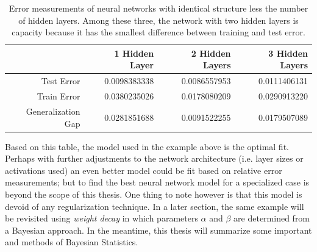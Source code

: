 \begin{table}[ht]
\centering
\begin{tabular}{rrrr}
  \hline
 & 1 Hidden Layer & 2 Hidden Layers & 3 Hidden Layers \\ 
  \hline
Test Error & 0.0098383338 & 0.0086557953 & 0.0111406131 \\ 
Train Error & 0.0380235026 & 0.0178080209 & 0.0290913220 \\ 
Generalization Gap & 0.0281851688 & 0.0091522255 & 0.0179507089 \\ 
   \hline
\end{tabular}
\caption{\footnotesize Error measurements of neural networks with identical structure less the number of hidden layers.  Among these three, the network with two hidden layers is capacity because it has the smallest difference between training and test error.}
\label{gengapt}
\end{table}

Based on this table, the model used in the example above is the optimal fit.  Perhaps with further adjustments to the network architecture (i.e. layer sizes or activations used) an even better model could be fit based on relative error measurements; but to find the best neural network model for a specialized case is beyond the scope of this thesis.  One thing to note however is that this model is devoid of any regularization technique.  In a later section, the same example will be revisited using \textit{weight decay} in which parameters $\alpha$ and $\beta$ are determined from a Bayesian approach.  In the meantime, this thesis will summarize some important and methods of Bayesian Statistics.

